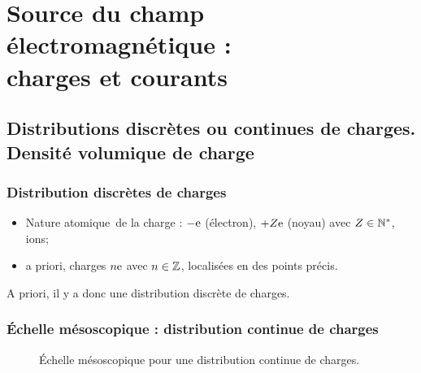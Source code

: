 \section[Charges et courants]{Source du champ électromagnétique :\\charges et courants}

    \subsection[Distributions discrètes ou continues de charges]{Distributions discrètes ou continues de charges. Densité volumique de charge}

        \subsubsection{Distribution discrètes de charges}

            \begin{itemize}[label=$\longrightarrow$]
                \item Nature \og atomique\fg~de la charge : $-\mathrm{e}$ (électron), $+Z\mathrm{e}$ (noyau) avec $Z\in\mathbb{N}^{*}$, ions;
                \item a priori, charges $n\mathrm{e}$ avec $n\in\mathbb{Z}$, localisées en des points précis. 
            \end{itemize}

            A priori, il y a donc une distribution discrète de charges.

        \subsubsection{Échelle mésoscopique : distribution continue de charges}

            \begin{figure}[h!]
                \centering
                \caption{Échelle mésoscopique pour une distribution continue de charges.}    
                \label{fig:echelle_meso_distribution_continue_charge}
            \end{figure}

